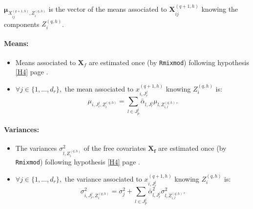 \documentclass[12pt,a4paper]{report}
\begin{document}
						
				$\boldsymbol{\mu}_{X_{i\bar{j}}^{(q+1,h)},Z_i^{(q,h)}}$ is the vector of the means associated to $\boldsymbol{X}_{i\bar{j}}^{(q+1,h)}$ knowing the components $Z_i^{(q,h)}$. 
				\paragraph{Means:}
\begin{itemize}
\item Means associated to $\boldsymbol{X}_f$ are estimated once (by {\tt Rmixmod}) following hypothesis \ref{H4} page \pageref{H4}. 
\item $\forall j \in \{1,\dots,d_r\},$ the mean associated to $x_{i,J_r^j}^{(q+1,h)}$ knowing $Z_i^{(q,h)}$ is:
	\begin{equation}
		\mu_{i,J_r^j,Z_i^{(q,h)}}=\sum_{l \in J_p^j}\bar{\alpha}_{l,J_r^j}   \mu_{l,Z_{i,l}^{(q,h)}}. \nonumber
	\end{equation}
\end{itemize}

\paragraph{Variances:}
\begin{itemize}
	\item The variances $\sigma^2_{l,Z_{i}^{(q,h)}}$ of the free covariates $\boldsymbol{X_f}$ are estimated once (by {\tt Rmixmod}) following hypothesis \ref{H4} page \pageref{H4}. 
	\item $\forall j \in \{1,\dots,d_r\},$ the variance associated to $x_{i,J_r^j}^{(q+1,h)}$ knowing $Z_i^{(q,h)}$ is:
	\begin{equation}
		\sigma^2_{i,J_r^j,Z_{i}^{(q,h)}}=\sigma_j^2+\sum_{l \in J_p^j}\bar{\alpha}_{l,J_r^j}^2\sigma^2_{l,Z_{i,l}^{(q,h)}}. \nonumber 
	\end{equation}
\end{itemize}
\end{document}
